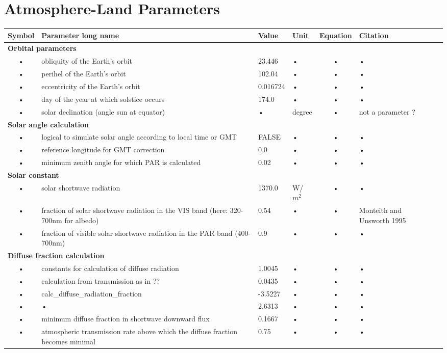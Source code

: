 \documentclass[11pt,oneside,openright,a4paper,fleqn]{book}  %
\begin{document}
\begin{table}
\section{Atmosphere-Land Parameters}\label{tab:atmland:param}

\begin{tabularx}{\linewidth}{|c|X|l|l|c|l|c|} %
\hline 
Symbol & Parameter long name & Value & Unit & Equation & Citation \\
\hline 

\multicolumn{6}{l}{\bf Orbital parameters}\\
\hline
• & obliquity of the Earth's orbit & 23.446 & • & • & • \\
• & perihel of the Earth's orbit & 102.04 & • & • & • \\
• & eccentricity of the Earth's orbit & 0.016724 & • & • & • \\
• & day of the year at which solstice occurs & 174.0 & • & • & • \\
• & solar declination (angle sun at equator) & • & degree & • & not a parameter ? \\
\hline 

\multicolumn{6}{l}{\bf Solar angle calculation}\\
\hline
• & logical to simulate solar angle according to local time or GMT & FALSE & • & • & • \\
• & reference longitude for GMT correction & 0.0 & • & • & • \\
• & minimum zenith angle for which PAR is calculated & 0.02 & • & • & • \\
\hline 

\multicolumn{6}{l}{\bf Solar constant}\\
\hline
• & solar shortwave radiation & 1370.0 & W/$m^2$ & • & • \\
• & fraction of solar shortwave radiation in the VIS band (here: 320-700nm for albedo) & 0.54 & • & • & Monteith and Unsworth 1995 \\
• & fraction of visible solar shortwave radiation in the PAR band (400-700nm) & 0.9 & • & • & • \\
\hline 

\multicolumn{6}{l}{\bf Diffuse fraction calculation}\\
\hline
• & constants for calculation of diffuse radiation & 1.0045 & • & • & • \\
• & calculation from transmission as in  ?? & 0.0435 & • & • & • \\
• & calc\_diffuse\_radiation\_fraction & -3.5227 & • & • & • \\
• & • & 2.6313 & • & • & • \\
• & minimum diffuse fraction in shortwave downward flux & 0.1667 & • & • & • \\
• & atmospheric transmission rate above which the diffuse fraction becomes minimal & 0.75 & • & • & • \\
\hline 


\end{tabularx}
\end{table}
\end{document}
